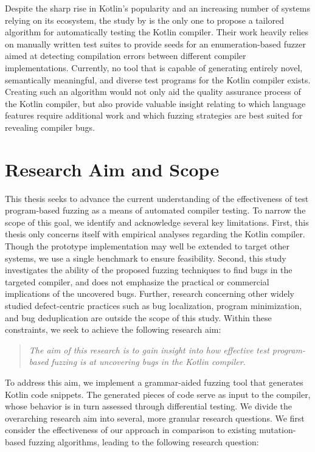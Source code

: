 Despite the sharp rise in Kotlin's popularity and an increasing
number of systems relying on its ecosystem, the study by \citet{stepanov2021type}
is the only one to propose a tailored algorithm for automatically 
testing the Kotlin compiler.
Their work heavily relies on manually written test suites to 
provide seeds for an enumeration-based fuzzer aimed at detecting compilation
errors between different compiler implementations. 
Currently, no tool that is capable of generating entirely novel, semantically 
meaningful, and diverse test programs for the Kotlin compiler exists.
Creating such an algorithm would not only aid the quality assurance process
of the Kotlin compiler, but also provide valuable insight relating to
which language features require additional work and which
fuzzing strategies are best suited for revealing compiler bugs.

\section{\label{sec:aim}Research Aim and Scope}

This thesis seeks to advance the current understanding of the
effectiveness of test program-based fuzzing as a means of automated compiler testing.
To narrow the scope of this goal, we identify and acknowledge several
key limitations.
First, this thesis only concerns itself with empirical analyses regarding
the Kotlin compiler. 
Though the prototype implementation may well be 
extended to target other systems, we use a single benchmark to ensure feasibility.
Second, this study investigates the ability of the proposed fuzzing
techniques to find bugs in the targeted compiler, and does not emphasize
the practical or commercial implications of the uncovered bugs.
Further, research concerning other widely studied defect-centric 
practices such as bug localization, program minimization, and bug deduplication
are outside the scope of this study.
Within these constraints, we seek to achieve the following research aim:

\begin{quote}
\centering 
\emph{The aim of this research is to gain insight into how 
effective test program-based fuzzing is at uncovering bugs in the
Kotlin compiler.}
\end{quote}

To address this aim, we implement a grammar-aided fuzzing tool
that generates Kotlin code snippets. 
The generated pieces of code serve as input to the compiler,
whose behavior is in turn assessed through differential testing.
We divide the overarching research aim into several, more granular
research questions.
We first consider the effectiveness of our approach in comparison
to existing mutation-based fuzzing algorithms, leading to
the following research question:

